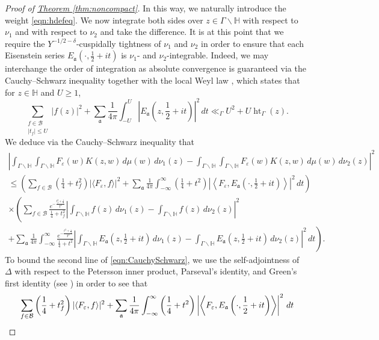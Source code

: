 \documentclass[11pt,a4paper]{amsart}
\newcommand{\af}{\mathfrak{a}}
\newcommand{\BB}{\mathcal{B}}
\newcommand{\e}{\varepsilon}
\newcommand{\Hb}{\mathbb{H}}
\DeclareMathOperator{\Ht}{ht}
\numberwithin{equation}{section}
\theoremstyle{remark}
\theoremstyle{definition}
\begin{document}
\begin{proof}[Proof of {\hyperref[thm:noncompact]{Theorem \ref*{thm:noncompact}}}]
In this way, we naturally introduce the weight \eqref{eqn:hdefeq}. We now integrate both sides over $z \in \Gamma \backslash \Hb$ with respect to $\nu_1$ and with respect to $\nu_2$ and take the difference. It is at this point that we require the $Y^{-1/2 - \delta}$-cuspidally tightness of $\nu_1$ and $\nu_2$ in order to ensure that each Eisenstein series $E_{\af}(\cdot,\frac{1}{2} + it)$ is $\nu_1$- and $\nu_2$-integrable. Indeed, we may interchange the order of integration as absolute convergence is guaranteed via the Cauchy--Schwarz inequality together with the local Weyl law \cite[Proposition 7.2]{Iwa02}, which states that for $z \in \Hb$ and $U \geq 1$,
\[\sum_{\substack{f \in \BB \\ |t_f| \leq U}} |f(z)|^2 + \sum_{\af} \frac{1}{4\pi} \int_{-U}^{U} \left|E_{\af}\left(z,\frac{1}{2} + it\right)\right|^2 \, dt \ll_{\Gamma} U^2 + U \Ht_{\Gamma}(z).\]
We deduce via the Cauchy--Schwarz inequality that
\begin{multline}
\label{eqn:CauchySchwarz}
\left|\int_{\Gamma \backslash \Hb} \int_{\Gamma \backslash \Hb} F_{\e}(w) K(z,w) \, d\mu(w) \, d\nu_1(z) - \int_{\Gamma \backslash \Hb} \int_{\Gamma \backslash \Hb} F_{\e}(w) K(z,w) \, d\mu(w) \, d\nu_2(z)\right|^2	\\
\leq \left(\sum_{f \in \BB} \left(\frac{1}{4} + t_f^2\right) |\langle F_{\e},f\rangle|^2 + \sum_{\af} \frac{1}{4\pi} \int_{-\infty}^{\infty} \left(\frac{1}{4} + t^2\right) \left|\left\langle F_{\e}, E_{\af}\left(\cdot, \frac{1}{2} + it\right)\right\rangle\right|^2 \, dt\right)	\\
\times \left(\sum_{f \in \BB} \frac{e^{-\frac{t_f^2 + \frac{1}{4}}{T^2}}}{\frac{1}{4} + t_f^2} \left|\int_{\Gamma \backslash \Hb} f(z) \, d\nu_1(z) - \int_{\Gamma \backslash \Hb} f(z) \, d\nu_2(z)\right|^2 \right.	\\
\left. + \sum_{\af} \frac{1}{4\pi} \int_{-\infty}^{\infty} \frac{e^{-\frac{t^2 + \frac{1}{4}}{T^2}}}{\frac{1}{4} + t^2} \left|\int_{\Gamma \backslash \Hb} E_{\af}\left(z,\frac{1}{2} + it\right) \, d\nu_1(z) - \int_{\Gamma \backslash \Hb} E_{\af}\left(z,\frac{1}{2} + it\right) \, d\nu_2(z)\right|^2 \, dt\right).
\end{multline}
To bound the second line of \eqref{eqn:CauchySchwarz}, we use the self-adjointness of $\Delta$ with respect to the Petersson inner product, Parseval's identity, and Green's first identity (see \cite[Lemma 4.1]{Iwa02}) in order to see that
\begin{align*}
\hspace{1.5cm} & \hspace{-1.5cm} \sum_{f \in \BB} \left(\frac{1}{4} + t_f^2\right) |\langle F_{\e},f\rangle|^2 + \sum_{\af} \frac{1}{4\pi} \int_{-\infty}^{\infty} \left(\frac{1}{4} + t^2\right) \left|\left\langle F_{\e}, E_{\af}\left(\cdot, \frac{1}{2} + it\right)\right\rangle\right|^2 \, dt	\\

\end{align*}
\end{proof}
\end{document}
